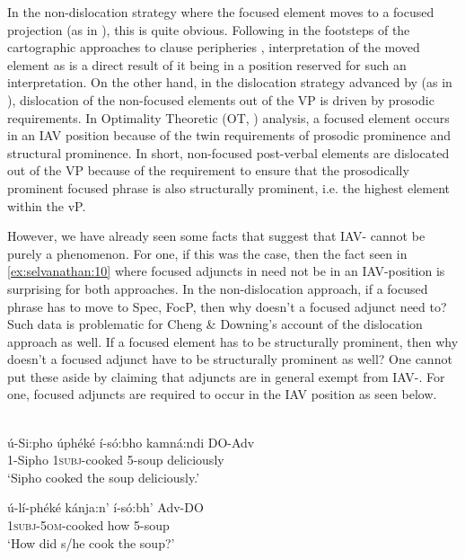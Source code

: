 \documentclass[output=paper
,newtxmath
,modfonts
,nonflat]{langsci/langscibook}
\begin{document}
In the non-dislocation strategy where the focused element moves to a focused projection (as in ), this is quite obvious. Following in the footsteps of the cartographic approaches to clause peripheries \citep{rizzi1997}, interpretation of the moved element as  is a direct result of it being in a position reserved for such an interpretation. On the other hand, in the dislocation strategy advanced by \citet{chengdowning2012} (as in ), dislocation of the non-focused elements out of the VP is driven by prosodic requirements. In  Optimality Theoretic (OT, \citealt{Prince1993}) analysis, a focused element occurs in an IAV position because of the twin requirements of prosodic prominence and structural prominence. In short, non-focused post-verbal elements are dislocated out of the VP because of the requirement to ensure that the prosodically prominent focused phrase is also structurally prominent, i.e. the highest element within the vP. 

However, we have already seen some  facts that suggest that IAV- cannot be purely a  phenomenon. For one, if this was the case, then the fact seen in \ref{ex:selvanathan:10} where focused adjuncts in  need not be in an IAV-position is surprising for both approaches. In the non-dislocation approach, if a focused phrase has to move to Spec, FocP, then why doesn't a focused adjunct need to? Such data is problematic for Cheng \& Downing's account of the dislocation approach as well. If a focused element has to be structurally prominent, then why doesn’t a focused adjunct have to be structurally prominent as well? One cannot put these aside by claiming that adjuncts are in general exempt from IAV-. For one,  focused adjuncts are required to occur in the IAV position as seen below.

\ea\label{ex:selvanathan:12}
 \citep[8]{chengdowning2014}\\
\ea\label{ex:selvanathan:12a}
	\gll ú-Si:pho  úphéké          í-só:bho   kamná:ndi  DO-Adv\\
	1-Sipho   \textsc{1subj}{}-cooked    5-soup    deliciously\\
\glt `Sipho cooked the soup deliciously.'

\ex\label{ex:selvanathan:12b}
	\gll ú-lí-phéké          kánja:n’    í-só:bh’     Adv-DO\\
\textsc{1subj}{}-\textsc{5om}{}-cooked   how     5-soup\\
\glt `How did s/he cook the soup?'
\end{document}
